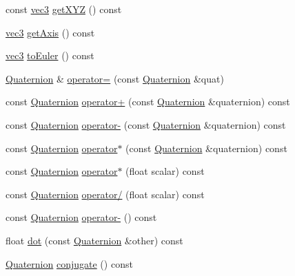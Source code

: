 \begin{DoxyCompactItemize}
\item 
const \hyperlink{structspork_1_1maths_1_1vec3}{vec3} \hyperlink{structspork_1_1maths_1_1_quaternion_a4eea744d712b05998e1be2db1fed60c4}{get\+X\+YZ} () const
\item 
\hyperlink{structspork_1_1maths_1_1vec3}{vec3} \hyperlink{structspork_1_1maths_1_1_quaternion_a67ced3bf831b837b22f927f86d0239fa}{get\+Axis} () const
\item 
\hyperlink{structspork_1_1maths_1_1vec3}{vec3} \hyperlink{structspork_1_1maths_1_1_quaternion_acc590420b3df4273167e59f5d380890f}{to\+Euler} () const
\item 
\hyperlink{structspork_1_1maths_1_1_quaternion}{Quaternion} \& \hyperlink{structspork_1_1maths_1_1_quaternion_af4ef2e359db6e90c8b59e1cdaf0ce02d}{operator=} (const \hyperlink{structspork_1_1maths_1_1_quaternion}{Quaternion} \&quat)
\item 
const \hyperlink{structspork_1_1maths_1_1_quaternion}{Quaternion} \hyperlink{structspork_1_1maths_1_1_quaternion_a037e6cfa22a82ecf57dc262088674f00}{operator+} (const \hyperlink{structspork_1_1maths_1_1_quaternion}{Quaternion} \&quaternion) const
\item 
const \hyperlink{structspork_1_1maths_1_1_quaternion}{Quaternion} \hyperlink{structspork_1_1maths_1_1_quaternion_af1c9b5ef7b54ca9de3f0b1e1b4b2894b}{operator-\/} (const \hyperlink{structspork_1_1maths_1_1_quaternion}{Quaternion} \&quaternion) const
\item 
const \hyperlink{structspork_1_1maths_1_1_quaternion}{Quaternion} \hyperlink{structspork_1_1maths_1_1_quaternion_ad818b807a969dbc6f97bdd43aba26fd5}{operator$\ast$} (const \hyperlink{structspork_1_1maths_1_1_quaternion}{Quaternion} \&quaternion) const
\item 
const \hyperlink{structspork_1_1maths_1_1_quaternion}{Quaternion} \hyperlink{structspork_1_1maths_1_1_quaternion_a44b376d43e6809b36c13c6700f4c3b7b}{operator$\ast$} (float scalar) const
\item 
const \hyperlink{structspork_1_1maths_1_1_quaternion}{Quaternion} \hyperlink{structspork_1_1maths_1_1_quaternion_ac2560ad77f0ca31d8f406933ee8d95b1}{operator/} (float scalar) const
\item 
const \hyperlink{structspork_1_1maths_1_1_quaternion}{Quaternion} \hyperlink{structspork_1_1maths_1_1_quaternion_abcba9ae87308fe8796c6d720a2f087d4}{operator-\/} () const
\item 
float \hyperlink{structspork_1_1maths_1_1_quaternion_a8ef8908ae0daefd7de38e6560c822b1f}{dot} (const \hyperlink{structspork_1_1maths_1_1_quaternion}{Quaternion} \&other) const
\item 
\hyperlink{structspork_1_1maths_1_1_quaternion}{Quaternion} \hyperlink{structspork_1_1maths_1_1_quaternion_acecfea67e6ddba5f238f1b23f5bf46a3}{conjugate} () const
\end{DoxyCompactItemize}
